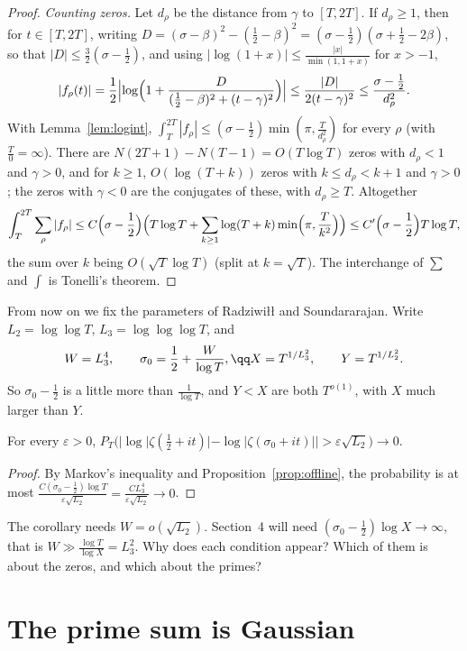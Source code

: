 \begin{proof}
\emph{Counting zeros.} Let $d_\rho$ be the distance from $\gamma$ to $[T,2T]$. If $d_\rho\ge1$, then for $t\in[T,2T]$, writing $D=(\sigma-\beta)^2-(\frac12-\beta)^2=(\sigma-\frac12)(\sigma+\frac12-2\beta)$, so that $|D|\le\frac32(\sigma-\frac12)$, and using $|\log(1+x)|\le\frac{|x|}{\min(1,1+x)}$ for $x>-1$,
\[
|f_\rho(t)|=\frac12\Bigl|\log\Bigl(1+\frac D{(\frac12-\beta)^2+(t-\gamma)^2}\Bigr)\Bigr|\le\frac{|D|}{2(t-\gamma)^2}\le\frac{\sigma-\frac12}{d_\rho^2}.
\]
With Lemma~\ref{lem:logint}, $\int_T^{2T}|f_\rho|\le(\sigma-\frac12)\min(\pi,\frac T{d_\rho^2})$ for every $\rho$ (with $\frac T{0}=\infty$). There are $N(2T+1)-N(T-1)=O(T\log T)$ zeros with $d_\rho<1$ and $\gamma>0$, and for $k\ge1$, $O(\log(T+k))$ zeros with $k\le d_\rho<k+1$ and $\gamma>0$; the zeros with $\gamma<0$ are the conjugates of these, with $d_\rho\ge T$. Altogether
\[
\int_T^{2T}\sum_\rho|f_\rho|\le C\Bigl(\sigma-\frac12\Bigr)\Bigl(T\log T+\sum_{k\ge1}\log(T+k)\min\Bigl(\pi,\frac T{k^2}\Bigr)\Bigr)\le C'\Bigl(\sigma-\frac12\Bigr)T\log T,
\]
the sum over $k$ being $O(\sqrt T\log T)$ (split at $k=\sqrt T$). The interchange of $\sum$ and $\int$ is Tonelli's theorem.
\end{proof}

From now on we fix the parameters of Radziwi\l\l{} and Soundararajan. Write $L_2=\log\log T$, $L_3=\log\log\log T$, and
\[
W=L_3^4,\qquad\sigma_0=\frac12+\frac W{\log T},\qq X=T^{1/L_3^2},\qquad Y=T^{1/L_2^2}.
\]
So $\sigma_0-\frac12$ is a little more than $\frac1{\log T}$, and $Y<X$ are both $T^{o(1)}$, with $X$ much larger than $Y$.

\begin{corollary}\label{cor:offline}
For every $\varepsilon>0$, $P_T\bigl(|\log|\zeta(\frac12+it)|-\log|\zeta(\sigma_0+it)||>\varepsilon\sqrt{L_2}\bigr)\to0$.
\end{corollary}
\begin{proof}
By Markov's inequality and Proposition~\ref{prop:offline}, the probability is at most $\frac{C(\sigma_0-\frac12)\log T}{\varepsilon\sqrt{L_2}}=\frac{CL_3^4}{\varepsilon\sqrt{L_2}}\to0$.
\end{proof}

\begin{think}
The corollary needs $W=o(\sqrt{L_2})$. Section~4 will need $(\sigma_0-\frac12)\log X\to\infty$, that is $W\gg\frac{\log T}{\log X}=L_3^2$. Why does each condition appear? Which of them is about the zeros, and which about the primes?
\end{think}

\section{The prime sum is Gaussian}

